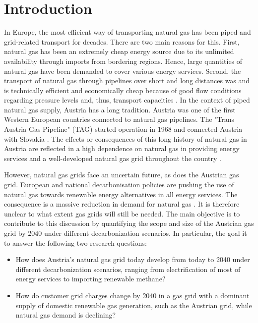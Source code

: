 \section{Introduction}

In Europe, the most efficient way of transporting natural gas has been piped and grid-related transport for decades. There are two main reasons for this. First, natural gas has been an extremely cheap energy source due to its unlimited availability through imports from bordering regions. Hence, large quantities of natural gas have been demanded to cover various energy services. Second, the transport of natural gas through pipelines over short and long distances was and is technically efficient and economically cheap because of good flow conditions regarding pressure levels and, thus, transport capacities \cite{thomas2003review}. In the context of piped natural gas supply, Austria has a long tradition. Austria was one of the first Western European countries connected to natural gas pipelines. The "Trans Austria Gas Pipeline" (TAG) started operation in 1968 and connected Austria with Slovakia \cite{gas_connect_austria}. The effects or consequences of this long history of natural gas in Austria are reflected in a high dependence on natural gas in providing energy services \cite{eurostat_natural_gas} and a well-developed natural gas grid throughout the country \cite{econtrol_grid}.\vspace{0.3cm}

However, natural gas grids face an uncertain future, as does the Austrian gas grid. European and national decarbonisation policies are pushing the use of natural gas towards renewable energy alternatives in all energy services. The consequence is a massive reduction in demand for natural gas \cite{repowereu}. It is therefore unclear to what extent gas grids will still be needed. The main objective is to contribute to this discussion by quantifying the scope and size of the Austrian gas grid by 2040 under different decarbonization scenarios. In particular, the goal it to answer the following two research questions:

\begin{itemize}
	\item How does Austria's natural gas grid today develop from today to 2040 under different decarbonization scenarios, ranging from electrification of most of energy services to importing renewable methane?
	\item How do customer grid charges change by 2040 in a gas grid with a dominant supply of domestic renewable gas generation, such as the Austrian grid, while natural gas demand is declining?
\end{itemize}

